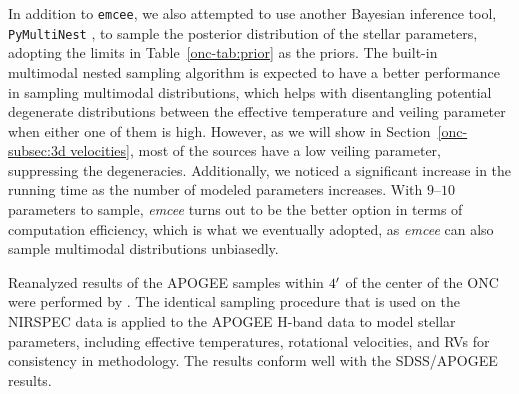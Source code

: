 \documentclass[12pt]{ucsddissertation}
\begin{document}
\begin{CJK*}{UTF8}{gbsn}
In addition to \texttt{emcee}, we also attempted to use another Bayesian inference tool, \linebreak\texttt{PyMultiNest} \citep[][]{PyMultiNest}, to sample the posterior distribution of the stellar parameters, adopting the limits in Table~\ref{onc-tab:prior} as the priors. The built-in multimodal nested sampling algorithm is expected to have a better performance in sampling multimodal distributions, which helps with disentangling potential degenerate distributions between the effective temperature and veiling parameter when either one of them is high. However, as we will show in Section~\ref{onc-subsec:3d velocities}, most of the sources have a low veiling parameter, suppressing the degeneracies. Additionally, we noticed a significant increase in the running time as the number of modeled parameters increases. With $9$--$10$ parameters to sample, \textit{emcee} turns out to be the better option in terms of computation efficiency, which is what we eventually adopted, as \textit{emcee} can also sample multimodal distributions unbiasedly.

Reanalyzed results of the APOGEE samples within $4\mbox{$^\prime$}$ of the center of the ONC were performed by . The identical sampling procedure that is used on the NIRSPEC data is applied to the APOGEE H-band data to model stellar parameters, including effective temperatures, rotational velocities, and RVs for consistency in methodology. The results conform well with the SDSS/APOGEE results.


\end{CJK*}
\end{document}
